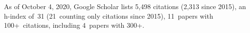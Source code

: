 As of October 4, 2020, Google Scholar lists
5,498 citations (2,313 since 2015),
an h-index of~31 (21~counting only citations since 2015),
11~papers with 100+~citations, including 4~papers with 300+.
